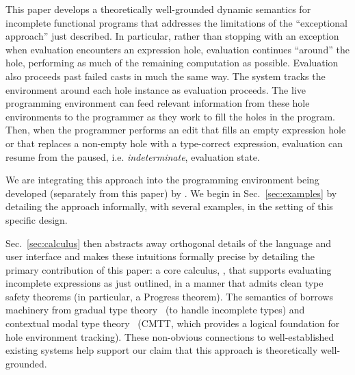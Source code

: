 
This paper develops a theoretically well-grounded dynamic semantics for incomplete functional programs that addresses the limitations of the ``exceptional approach'' just described. 
In particular, rather than stopping with an exception when evaluation encounters an expression hole, evaluation continues ``around'' the hole, performing as much of the remaining computation as possible. 
Evaluation also proceeds past failed casts in much the same way. 
The system tracks the environment around each hole instance as evaluation proceeds. 
The live programming environment can feed relevant information from these hole environments to the programmer as they work to fill the holes in the program. 
Then, when the programmer performs an edit that fills an empty expression hole or that replaces a non-empty hole with a type-correct expression, evaluation can resume from the paused, i.e. \emph{indeterminate}, evaluation state.


\newcommand{\contribution}[2]{\paragraph{#1. #2}} 

We are integrating this approach into the \Hazel programming environment being developed (separately from this paper) by \citet{HazelnutSNAPL}. 
We begin in Sec.~\ref{sec:examples} by detailing the approach informally, with several examples, in the setting of this specific design.

Sec.~\ref{sec:calculus} then abstracts away orthogonal details of the language and user interface and makes these intuitions formally precise by detailing the primary contribution of this paper: a core calculus, \HazelnutLive, that supports evaluating incomplete expressions as just outlined, in a manner that admits clean type safety theorems (in particular, a Progress theorem). The semantics of \HazelnutLive borrows machinery from gradual type theory~\cite{DBLP:conf/snapl/SiekVCB15}
(to handle incomplete types) and contextual modal type theory~\cite{Nanevski2008} (CMTT,
which provides a logical foundation for hole environment tracking). 
These non-obvious connections to well-established existing systems help support our claim that this approach is theoretically well-grounded.

